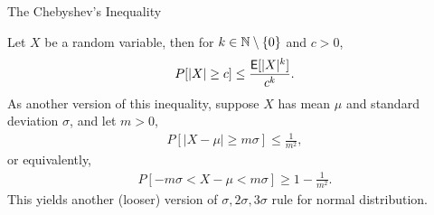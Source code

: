 \begin{frame}{The Chebyshev's Inequality}

\justifying
{} Let $X$ be a random variable, then for $k\in \mathbb{N}\setminus\{0\}$ and $c > 0$,
\begin{align*}
P[|X| \geq c] \leq \frac{\mathsf{E}[|X|^k]}{c^k}.
\end{align*}
As another version of this inequality, suppose $X$ has mean $\mu$ and standard deviation $\sigma$, and let $m > 0$,
\begin{align*}
P[|X - \mu| \geq m\sigma] \leq \frac{1}{m^2},
\end{align*}
or equivalently,
\begin{align*}
P[-m\sigma < X - \mu < m\sigma] \geq 1 - \frac{1}{m^2}.
\end{align*}
 This yields another (looser) version of $\sigma, 2\sigma, 3\sigma$ rule for normal distribution.

\end{frame}


